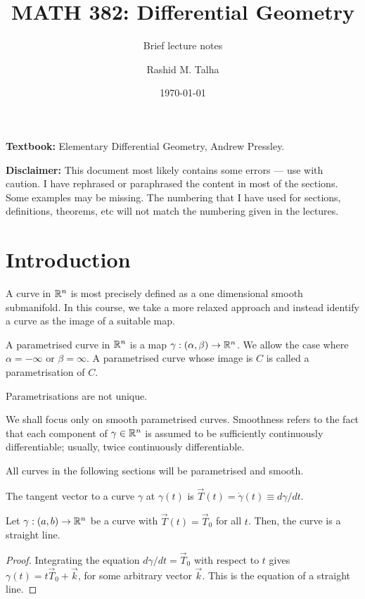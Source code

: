 \documentclass[11pt]{penrose}
\title{MATH 382: Differential Geometry}
\subtitle{Brief lecture notes}
\author{Rashid M. Talha}
\affiliation{School of Natural Sciences, NUST}
\date{\today}
\newcommand{\vT}{\vec{T}}
\newcommand{\keyword}[1]{\textsf{#1}}
\begin{document}
\maketitle

\textbf{Textbook:} Elementary Differential Geometry, Andrew Pressley.

\textbf{Disclaimer:} This document most likely contains some errors --- use with caution. I have rephrased or paraphrased the content in most of the sections. Some examples may be missing. The numbering that I have used for sections, definitions, theorems, etc will not match the numbering given in the lectures.

\section{Introduction}
A curve in $\mathbb{R}^n$ is most precisely defined as a one dimensional smooth submanifold. In this course, we take a more relaxed approach and instead identify a curve as the image of a suitable map.

\begin{ndfn}
    A \keyword{parametrised curve} in $\mathbb{R}^n$ is a map $\gamma : (\alpha, \beta) \to \mathbb{R}^n$. We allow the case where $\alpha = -\infty$ or $\beta = \infty$. A parametrised curve whose image is $C$ is called a \keyword{parametrisation} of $C$.
\end{ndfn}

Parametrisations are not unique.

We shall focus only on smooth parametrised curves. Smoothness refers to the fact that each component of $\gamma \in \mathbb{R}^n$ is assumed to be sufficiently continuously differentiable; usually, twice continuously differentiable.

All curves in the following sections will be parametrised and smooth.

\begin{ndfn}
    The \keyword{tangent vector} to a curve $\gamma$ at $\gamma(t)$ is $\vT(t) = \dot{\gamma}(t) \equiv d\gamma/dt$.
\end{ndfn}

\begin{nprop}
    Let $\gamma : (a, b) \to \mathbb{R}^n$ be a curve with $\vT(t) = \vT_0$ for all $t$. Then, the curve is a straight line.
\end{nprop}
\begin{proof}
    Integrating the equation $d\gamma/dt = \vT_0$ with respect to $t$ gives $\gamma(t) = t \vT_0 + \vec{k}$, for some arbitrary vector $\vec{k}$. This is the equation of a straight line.
\end{proof}
\end{document}
